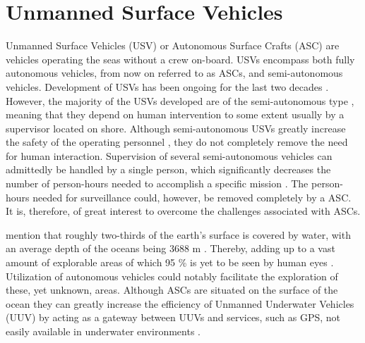 \chapter{Unmanned Surface Vehicles} %

\label{Unmanned_Surface_Vehicles} %

Unmanned Surface Vehicles (USV) or Autonomous Surface Crafts (ASC) are vehicles operating the seas without a crew on-board.
USVs encompass both fully autonomous vehicles, from now on referred to as ASCs, and semi-autonomous vehicles.
Development of USVs has been ongoing for the last two decades \cite{manley2008unmanned}.
However, the majority of the USVs developed are of the semi-autonomous type \cite{liu2016unmanned,park2017development}, meaning that they depend on human intervention to some extent usually by a supervisor located on shore.
Although semi-autonomous USVs greatly increase the safety of the operating personnel \cite{liu2016unmanned}, they do not completely remove the need for human interaction.
Supervision of several semi-autonomous vehicles can admittedly be handled by a single person, which significantly decreases the number of person-hours needed to accomplish a specific mission \cite{manley2008unmanned}.
The person-hours needed for surveillance could, however, be removed completely by a ASC.
It is, therefore, of great interest to overcome the challenges associated with ASCs.


\textcite{Yuh2011} mention that roughly two-thirds of the earth's surface is covered by water, with an average depth of the oceans being 3688 m \cite{depth_ocean}.
Thereby, adding up to a vast amount of explorable areas of which 95 \% is yet to be seen by human eyes \cite{explored_percentage}. Utilization of autonomous vehicles could notably facilitate the  exploration of these, yet unknown, areas.
Although ASCs are situated on the surface of the ocean they can greatly increase the efficiency of Unmanned Underwater Vehicles (UUV) by acting as a gateway between UUVs and services, such as GPS, not easily available in underwater environments \cite{liu2016unmanned}.

